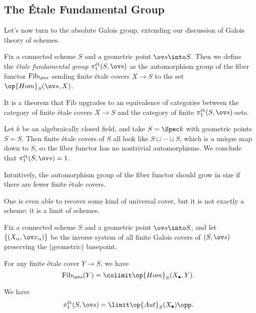 \documentclass[../notes.tex]{subfiles}
\begin{document}
\subsection{The \'Etale Fundamental Group}
Let's now turn to the absolute Galois group, extending our discussion of Galois theory of schemes.
\begin{defihelper} 
	Fix a connected scheme $S$ and a geometric point $\ov s\into S$. Then we define the \textit{\'etale fundamental group} $\pi_1^{\mathrm{\acute et}}(S,\ov s)$ as the automorphism group of the fiber functor $\mathrm{Fib}_{\ov s}$ sending finite \'etale covers $X\to S$ to the set $\op{Hom}_S(\ov s,X)$.
\end{defihelper}
\begin{remark}
	It is a theorem that $\mathrm{Fib}$ upgrades to an equivalence of categories between the category of finite \'etale covers $X\to S$ and the category of finite $\pi_1^{\mathrm{\acute et}}(S,\ov s)$-sets.
\end{remark}
\begin{example}
	Let $k$ be an algebraically closed field, and take $S=\Spec k$ with geometric points $S=S$. Then finite \'etale covers of $S$ all look like $S\sqcup\cdots\sqcup S$, which is a unique map down to $S$, so the fiber functor has no nontrivial automorphisms. We conclude that $\pi_1^{\mathrm{\acute et}}(S,\ov s)=1$.
\end{example}
\begin{remark}
	Intuitively, the automorphism group of the fiber functor should grow in size if there are fewer finite \'etale covers.
\end{remark}
One is even able to recover some kind of universal cover, but it is not exactly a scheme: it is a limit of schemes.
\begin{proposition}
	Fix a connected scheme $S$ and a geometric point $\ov s\into S$, and let $\{(X_\alpha,\ov x_\alpha)\}$ be the inverse system of all finite Galois covers of $(S,\ov s)$ preserving the (geometric) basepoint.
	\begin{listalph}
		\item For any finite \'etale cover $Y\to S$, we have
		\[\mathrm{Fib}_{\ov s}(Y)=\colimit\op{Hom}_S(X_\bullet,Y).\]
		\item We have
		\[\pi_1^{\mathrm{\acute et}}(S,\ov s)=\limit\op{Aut}_S(X_\bullet)\opp.\]
	\end{listalph}
\end{proposition}
\end{document}
